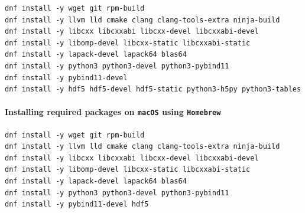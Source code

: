 \begin{verbatim}
dnf install -y wget git rpm-build
dnf install -y llvm lld cmake clang clang-tools-extra ninja-build
dnf install -y libcxx libcxxabi libcxx-devel libcxxabi-devel 
dnf install -y libomp-devel libcxx-static libcxxabi-static
dnf install -y lapack-devel lapack64 blas64
dnf install -y python3 python3-devel python3-pybind11
dnf install -y pybind11-devel
dnf install -y hdf5 hdf5-devel hdf5-static python3-h5py python3-tables
\end{verbatim}

\paragraph{Installing required packages on \texttt{macOS} using \texttt{Homebrew}}

\begin{verbatim}
dnf install -y wget git rpm-build
dnf install -y llvm lld cmake clang clang-tools-extra ninja-build
dnf install -y libcxx libcxxabi libcxx-devel libcxxabi-devel
dnf install -y libomp-devel libcxx-static libcxxabi-static
dnf install -y lapack-devel lapack64 blas64
dnf install -y python3 python3-devel python3-pybind11
dnf install -y pybind11-devel hdf5
\end{verbatim}



